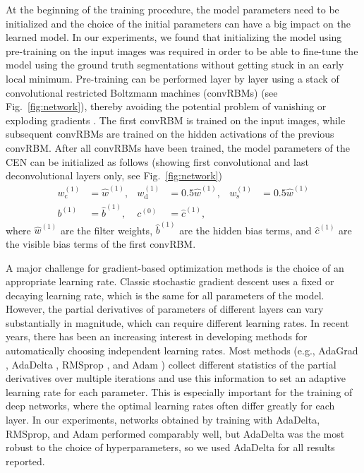 At the beginning of the training procedure, the model parameters need to be
initialized and the choice of the initial parameters can have a big impact on
the learned model. In our experiments, we found that initializing the model
using pre-training \cite{Hinton2006} on the input images was required in order
to be able to fine-tune the model using the ground truth segmentations without
getting stuck in an early local minimum. Pre-training can be performed layer by
layer \cite{Hinton2006b} using a stack of convolutional restricted Boltzmann
machines (convRBMs) \cite{lee2009convolutional} (see Fig.~\ref{fig:network}),
thereby avoiding the potential problem of vanishing or exploding gradients
\cite{hochreiter1991untersuchungen}. The first convRBM is trained on the input
images, while subsequent convRBMs are trained on the hidden activations of the
previous convRBM. After all convRBMs have been trained, the model parameters of
the CEN can be initialized as follows (showing first convolutional and last
deconvolutional layers only, see Fig.~\ref{fig:network})
\begin{align}
w_{\text{c}}^{(1)} &= \hat{w}^{(1)}, &
w_{\text{d}}^{(1)} &= 0.5\hat{w}^{(1)}, &
w_{\text{s}}^{(1)} &= 0.5\hat{w}^{(1)} \\
b^{(1)} &= \hat{b}^{(1)}, &
c^{(0)} &= \hat{c}^{(1)},
\end{align}
where $\hat{w}^{(1)}$ are the filter weights, $\hat{b}^{(1)}$ are the hidden
bias terms, and $\hat{c}^{(1)}$ are the visible bias terms of the first convRBM.

A major challenge for gradient-based optimization methods is the choice of an
appropriate learning rate. Classic stochastic gradient descent \cite{LeCun1998}
uses a fixed or decaying learning rate, which is the same for all parameters of
the model. However, the partial derivatives of parameters of different layers
can vary substantially in magnitude, which can require different learning rates.
In recent years, there has been an increasing interest in developing methods for
automatically choosing independent learning rates. Most methods (e.g., AdaGrad
\cite{duchi2011adaptive}, AdaDelta \cite{zeiler2012adadelta}, RMSprop
\cite{dauphin2015rmsprop}, and Adam \cite{kingma2014adam}) collect different
statistics of the partial derivatives over multiple iterations and use this
information to set an adaptive learning rate for each parameter. This is
especially important for the training of deep networks, where the optimal
learning rates often differ greatly for each layer. In our experiments, networks
obtained by training with AdaDelta, RMSprop, and Adam performed comparably well,
but AdaDelta was the most robust to the choice of hyperparameters, so we used
AdaDelta for all results reported.

